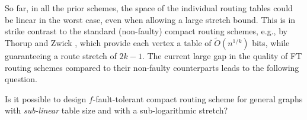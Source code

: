 So far, in all the prior schemes, the space of the individual routing tables could be linear in the worst case, even when allowing a large stretch bound. This is in strike contrast to the standard (non-faulty) compact routing schemes, e.g., by Thorup and Zwick \cite{thorup2001compact}, which provide each vertex a table of $\widetilde{O}(n^{1/k})$ bits, while guaranteeing a route stretch of $2k-1$. The current large gap in the quality of FT routing schemes compared to their non-faulty counterparts leads to the following question.

\begin{question}\label{q:route}
Is it possible to design $f$-fault-tolerant compact routing scheme for general graphs with \emph{sub-linear} table size and with a sub-logarithmic stretch?
\end{question}







